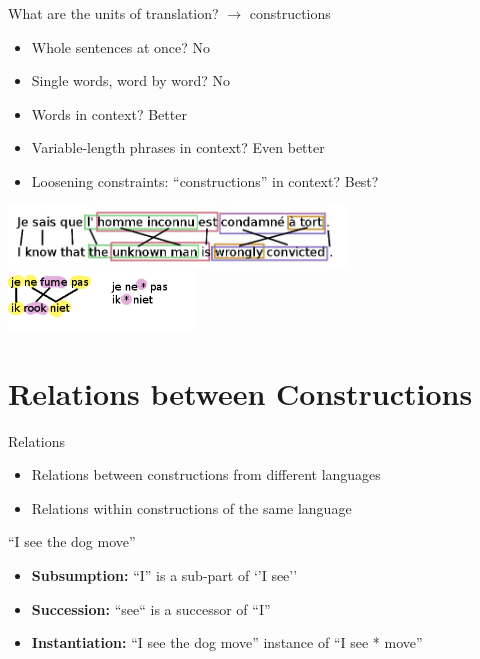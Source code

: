 \documentclass[compress]{beamer}
\begin{document}
\begin{frame}
	\begin{block}{What are the units of translation? $\rightarrow$ constructions }
		\begin{itemize}
			\item Whole sentences at once? No \\
			\item Single words, word by word? No \\
			\item Words in context? Better \\
			\item Variable-length phrases in context? Even better \\
			\item Loosening constraints: ``constructions'' in context? Best? \\
		\end{itemize}
	\end{block}

	\begin{center}
		 \includegraphics[width=90.0mm]{pbmbmt_alignment1c.jpg} \\
		 \includegraphics[width=50.0mm]{skipgram.png}
	\end{center}
\end{frame}


\section{Relations between Constructions}

\begin{frame}
	\begin{block}{Relations}		
		\begin{itemize}
			\item Relations between constructions from different languages
			\item Relations within constructions of the same language
		\end{itemize}
	\end{block}

	\begin{example}
		``I see the dog move''
		\begin{itemize}
			\item \textbf{Subsumption:}   ``I'' is a sub-part of `'I see''
			\item \textbf{Succession:}	  ``see`` is a successor of ``I''
			\item \textbf{Instantiation:}   ``I see the dog move'' instance of ``I see * move''
		\end{itemize}
	\end{example}
\end{frame}
\end{document}
